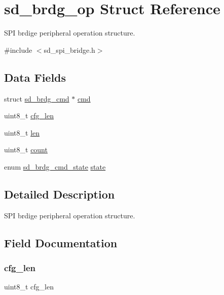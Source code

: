 \hypertarget{structsd__brdg__op}{}\section{sd\+\_\+brdg\+\_\+op Struct Reference}
\label{structsd__brdg__op}


S\+PI brdige peripheral operation structure.  




{\ttfamily \#include $<$sd\+\_\+spi\+\_\+bridge.\+h$>$}

\subsection*{Data Fields}
\begin{DoxyCompactItemize}
\item 
struct \mbox{\hyperlink{structsd__brdg__cmd}{sd\+\_\+brdg\+\_\+cmd}} $\ast$ \mbox{\hyperlink{structsd__brdg__op_a61d7114c96c2ffeb66ccd43c213f627a}{cmd}}
\item 
uint8\+\_\+t \mbox{\hyperlink{structsd__brdg__op_ad2c42908da65255bf3f613f2aabcbaf0}{cfg\+\_\+len}}
\item 
uint8\+\_\+t \mbox{\hyperlink{structsd__brdg__op_a5723e60ffd628510c699eddbce90be23}{len}}
\item 
uint8\+\_\+t \mbox{\hyperlink{structsd__brdg__op_a20302e2c99a60d3f612dba57e3f6333b}{count}}
\item 
enum \mbox{\hyperlink{group___s_d___b_r_d_g___types_gaa60a189c7c824797307ab14f0c594610}{sd\+\_\+brdg\+\_\+cmd\+\_\+state}} \mbox{\hyperlink{structsd__brdg__op_adde4bff8a8812e447e9b0a554f08c8e9}{state}}
\end{DoxyCompactItemize}


\subsection{Detailed Description}
S\+PI brdige peripheral operation structure. 

\subsection{Field Documentation}
\mbox{\label{structsd__brdg__op_ad2c42908da65255bf3f613f2aabcbaf0}} 
\subsubsection{\texorpdfstring{cfg\+\_\+len}{cfg\_len}}
{\footnotesize\ttfamily uint8\+\_\+t cfg\+\_\+len}

